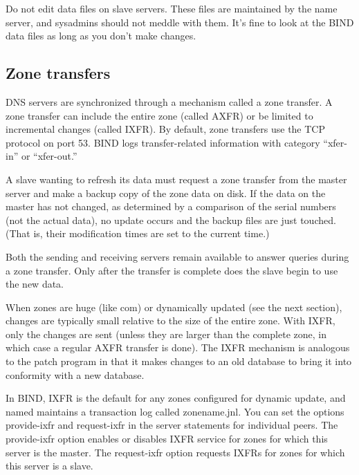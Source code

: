 Do not edit data files on slave servers. These files are maintained by
the name server, and sysadmins should not meddle with them. It's fine to
look at the BIND data files as long as you don't make changes.


\subsection{Zone transfers}
\label{sec:zone-transfers}

\protect\hypertarget{part0024_split_051.htmlux5cux23_idIndexMarker2219}{}{}\protect\hypertarget{part0024_split_051.htmlux5cux23_idIndexMarker2220}{}{}\protect\hypertarget{part0024_split_051.htmlux5cux23_idIndexMarker2221}{}{}\protect\hypertarget{part0024_split_051.htmlux5cux23_idIndexMarker2222}{}{}\protect\hypertarget{part0024_split_051.htmlux5cux23_idIndexMarker2223}{}{}DNS
servers are synchronized through a mechanism called a zone transfer. A
zone transfer can include the entire zone (called AXFR) or be limited to
incremental changes (called IXFR). By default, zone transfers use the
TCP protocol on port 53. BIND logs transfer-related information with
category ``xfer-in'' or ``xfer-out.''

A slave wanting to refresh its data must request a zone transfer from
the master server and make a backup copy of the zone data on disk. If
the data on the master has not changed, as determined by a comparison of
the serial numbers (not the actual data), no update occurs and the
backup files are just touched. (That is, their modification times are
set to the current time.)

Both the sending and receiving servers remain available to answer
queries during a zone transfer. Only after the transfer is complete does
the slave begin to use the new data.

When zones are huge (like com) or dynamically updated (see the next
section), changes are typically small relative to the size of the entire
zone. With IXFR, only the changes are sent (unless they are larger than
the complete zone, in which case a regular AXFR transfer is done). The
IXFR mechanism is analogous to the {patch} program in that it makes
changes to an old database to bring it into conformity with a new
database.

In BIND, IXFR is the default for any zones configured for dynamic
update, and {named} maintains a transaction log called {zonename}{.jnl}.
You can set the options {provide-ixfr} and {request-ixfr} in the
{server} statements for individual peers. The {provide-ixfr} option
enables or disables IXFR service for zones for which this server is the
master. The {request-ixfr} option requests IXFRs for zones for which
this server is a slave.

